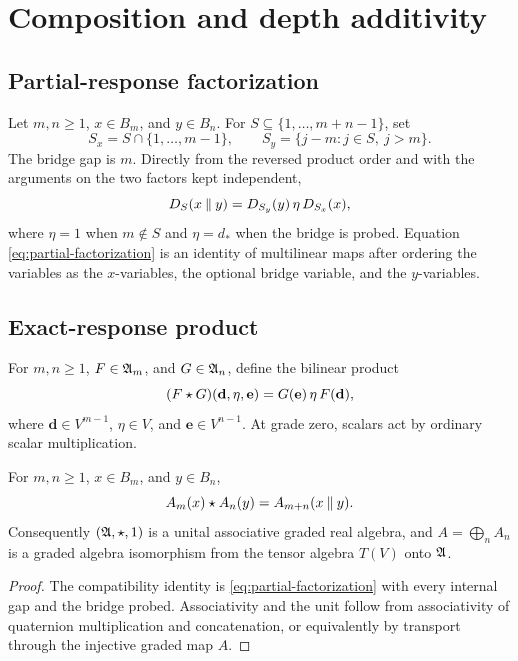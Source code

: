 \section{Composition and depth additivity}\label{sec:depth}

\subsection{Partial-response factorization}

Let $m,n\ge1$, $x\in B_m$, and $y\in B_n$.  For
$S\subseteq\{1,\ldots,m+n-1\}$, set
\[
  S_x=S\cap\{1,\ldots,m-1\},
  \qquad
  S_y=\{j-m:j\in S,\ j>m\}.
\]
The bridge gap is $m$.  Directly from the reversed product order and with the arguments on the two factors kept independent,
\begin{equation}\label{eq:partial-factorization}
  D_S(x\mathbin{\Vert} y)
  =D_{S_y}(y)\,\eta\,D_{S_x}(x),
\end{equation}
where $\eta=1$ when $m\notin S$ and $\eta=d_*$ when the bridge is probed.  Equation \eqref{eq:partial-factorization} is an identity of multilinear maps after ordering the variables as the $x$-variables, the optional bridge variable, and the $y$-variables.

\subsection{Exact-response product}

For $m,n\ge1$, $F\in\mathfrak A_m$, and $G\in\mathfrak A_n$, define the bilinear product
\begin{equation}\label{eq:bridge-product}
  (F\star G)(\mathbf d,\eta,\mathbf e)
  =G(\mathbf e)\,\eta\,F(\mathbf d),
\end{equation}
where $\mathbf d\in V^{m-1}$, $\eta\in V$, and $\mathbf e\in V^{n-1}$.  At grade zero, scalars act by ordinary scalar multiplication.

\begin{proposition}\label{prop:bridge}
For $m,n\ge1$, $x\in B_m$, and $y\in B_n$,
\[
  A_m(x)\star A_n(y)=A_{m+n}(x\mathbin{\Vert} y).
\]
Consequently $(\mathfrak A,\star,1)$ is a unital associative graded real algebra, and $A=\bigoplus_n A_n$ is a graded algebra isomorphism from the tensor algebra $T(V)$ onto $\mathfrak A$.
\end{proposition}

\begin{proof}
The compatibility identity is \eqref{eq:partial-factorization} with every internal gap and the bridge probed.  Associativity and the unit follow from associativity of quaternion multiplication and concatenation, or equivalently by transport through the injective graded map $A$.
\end{proof}

